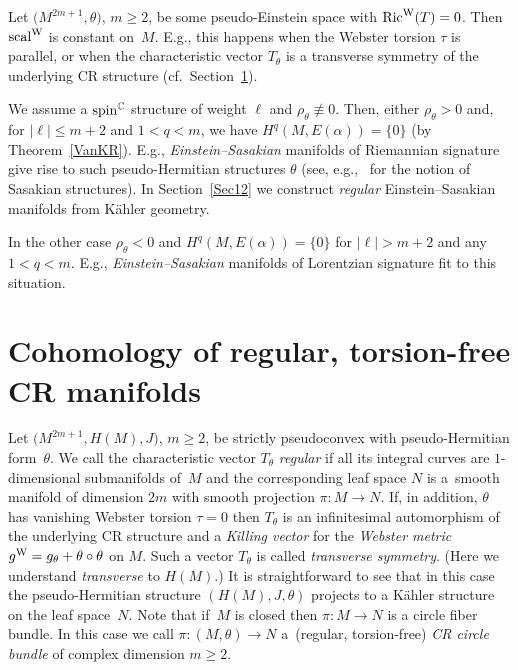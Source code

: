 \documentclass[pdftex]{sigma}
\numberwithin{equation}{section}
\newcommand{\CC}{\mathbb{C}}
\begin{document}
\begin{Example} Let $\big(M^{2m+1},\theta\big)$, $m\geq 2$, be some pseudo-Einstein space with $\operatorname{Ric}^{\rm W}(T)=0$.
Then ${\rm scal}^{\rm W}$ is constant on~$M$. E.g., this happens when the Webster torsion $\tau$ is parallel,
or when the characteristic vector $T_\theta$ is a transverse symmetry of the underlying CR structure
(cf.\ Section~\ref{Sec11}).

We assume a ${\rm spin}^\CC$ structure of weight $\ell$ and $\rho_\theta\not\equiv 0$.
Then, either $\rho_\theta>0$ and, for $|\ell|\leq m+2$ and $1<q<m$,
we have $H^q(M,E(\alpha))=\{0\}$ (by Theorem~\ref{VanKR}).
E.g., {\em Einstein--Sasakian} manifolds of Riemannian signature give rise to such pseudo-Hermitian structures $\theta$
(see, e.g.,~\cite{Blair} for the notion of Sasakian structures).
In Section~\ref{Sec12} we construct {\em regular} Einstein--Sasakian manifolds from K\"ahler geometry.

In the other case $\rho_\theta<0$ and $H^q(M,E(\alpha))=\{0\}$ for $|\ell|> m+2$ and any $1<q<m$.
E.g., {\em Einstein--Sasakian} manifolds of Lorentzian signature fit to this situation.
\end{Example}

\section{Cohomology of regular, torsion-free CR manifolds} \label{Sec11}

Let $\big(M^{2m+1},H(M),J\big)$, $m\geq 2$, be strictly pseudoconvex with pseudo-Hermitian form~$\theta$. We call the characteristic vector
$T_\theta$ {\em regular} if all its integral curves are $1$-dimensional submanifolds of~$M$ and the corresponding leaf space $N$ is a~smooth manifold
of dimension $2m$ with smooth projection $\pi\colon M\to N$. If, in addition, $\theta$ has vanishing Webster torsion $\tau=0$ then $T_\theta$ is an infinitesimal
automorphism of the underlying CR structure and a {\em Killing vector} for the {\em Webster metric} $g^{\rm W}=g_\theta+\theta\circ\theta$ on $M$.
Such a vector $T_\theta$ is called {\em transverse symmetry}. (Here we understand {\em transverse} to $H(M)$.)
It is
straightforward to see that in this case the pseudo-Hermitian structure
 $(H(M),J,\theta)$ projects to a K\"ahler structure on the leaf space~$N$. Note that if~$M$ is closed then $\pi\colon M\to N$ is a circle fiber bundle. In this case we call $\pi\colon (M,\theta)\to N$ a~(regular, torsion-free) {\em CR circle bundle} of complex dimension $m\geq 2$.
\end{document}
